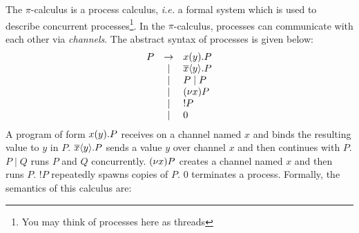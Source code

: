 \documentclass[10pt,a4paper]{exam} %
\begin{document}
\begin{questions}
\question The $\pi$-calculus is a process calculus, \emph{i.e.} a formal system which is used to describe concurrent processes\footnote{You may think of processes here as threads}. In the $\pi$-calculus, processes can communicate with each other via \emph{channels}. The abstract syntax of processes is given below:
\begin{displaymath}
\begin{array}{lcl}
P & \to & x(y).P\\
  & \mid & \overline{x}\langle y \rangle.P\\
  & \mid & P \mid P \\
  & \mid & (\nu x)P\\
  & \mid & !P\\
  & \mid & 0
\end{array}
\end{displaymath}
A program of form $x(y).P$ receives on a channel named $x$ and binds the resulting value to $y$ in $P$. $\overline{x}\langle y \rangle.P$ sends a value $y$ over channel $x$ and then continues with $P$. $P \mid Q$ runs $P$ and $Q$ concurrently. $(\nu x)P$ creates a channel named $x$ and then runs $P$. $!P$ repeatedly spawns copies of $P$. $0$ terminates a process. Formally, the semantics of this calculus are:

\end{questions}
\end{document}
